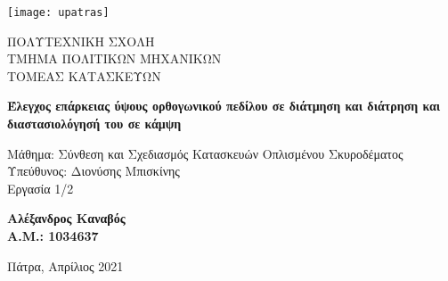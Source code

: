 \pagestyle{empty}
\begin{titlepage}
	\begin{center}

		\vspace*{0cm}

		\texttt{[image: upatras]}

		\normalsize
		{ΠΟΛΥΤΕΧΝΙΚΗ ΣΧΟΛΗ\\ΤΜΗΜΑ ΠΟΛΙΤΙΚΩΝ ΜΗΧΑΝΙΚΩΝ\\ΤΟΜΕΑΣ ΚΑΤΑΣΚΕΥΩΝ}

		\vspace{4.5cm}

		\large
		\textbf{Έλεγχος επάρκειας ύψους ορθογωνικού πεδίλου σε διάτμηση και διάτρηση και διαστασιολόγησή του σε κάμψη}

		\vspace{3cm}

		\normalsize
		{Μάθημα: Σύνθεση και Σχεδιασμός Κατασκευών Οπλισμένου Σκυροδέματος\\Υπεύθυνος: Διονύσης Μπισκίνης\\Εργασία 1/2}

		\vspace{3cm}

		\large
		\textbf{Αλέξανδρος Καναβός\\Α.Μ.: 1034637}

		\vfill

		\normalsize
		{Πάτρα, Απρίλιος 2021}

	\end{center}
\end{titlepage}
